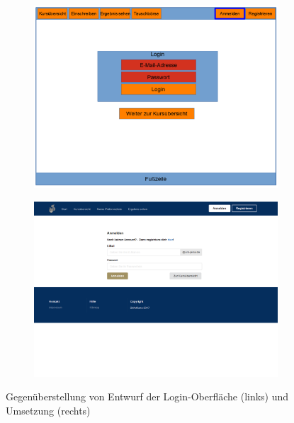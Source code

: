         \begin{figure}
            \centering
            \begin{subfigure}{0.4\textwidth}
                \includegraphics[width=1.0\textwidth]{./implementation/images/MockUpsFrontend/frontendLogin.png}
            \end{subfigure}
            \begin{subfigure}{0.59\textwidth}
                \includegraphics[width=1.0\textwidth]{./implementation/images/login.png}
            \end{subfigure}
            \caption{Gegenüberstellung von Entwurf der Login-Oberfläche (links) und Umsetzung (rechts)}
            \label{fig:comparisonLogin}
        \end{figure}
    
